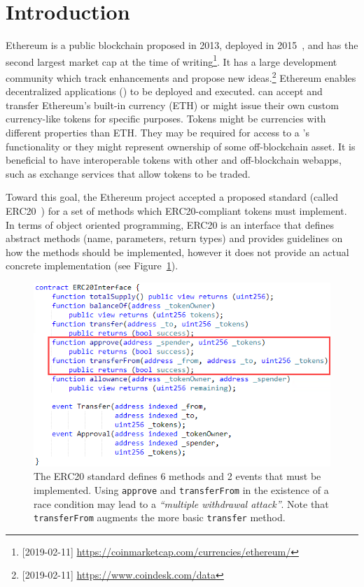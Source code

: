
\section{Introduction}


Ethereum is a public blockchain proposed in 2013, deployed in 2015~\cite{Ref00}, and has the second largest market cap at the time of writing\footnote{[2019-02-11] \url{https://coinmarketcap.com/currencies/ethereum/}}. It has a large development community which track enhancements and propose new ideas.\footnote{[2019-02-11] \url{https://www.coindesk.com/data}} Ethereum enables decentralized applications (\dapps) to be deployed and executed. \dapps can accept and transfer Ethereum's built-in currency (ETH) or might issue their own custom currency-like tokens for specific purposes. Tokens might be currencies with different properties than ETH. They may be required for access to a \dapp's functionality or they might represent ownership of some off-blockchain asset. It is beneficial to have interoperable tokens with other \dapps and off-blockchain webapps, such as exchange services that allow tokens to be traded.

Toward this goal, the Ethereum project accepted a proposed standard (called ERC20~\cite{Ref08}) for a set of methods which ERC20-compliant tokens must implement. In terms of object oriented programming, ERC20 is an interface that defines abstract methods (name, parameters, return types) and provides guidelines on how the methods should be implemented, however it does not provide an actual concrete implementation (see Figure~\ref{fig:erc20api}). 

\begin{figure}[t!]
	\centering
	\includegraphics[width=1.0\linewidth]{figures/multiple_withdrawal_01.png}
	\caption{The ERC20 standard defines 6 methods and 2 events that must be implemented. Using \texttt{approve} and \texttt{transferFrom} in the existence of a race condition may lead to a \textit{``multiple withdrawal attack''}. Note that \texttt{transferFrom} augments the more basic \texttt{transfer} method.}\label{fig:erc20api}
\end{figure}


